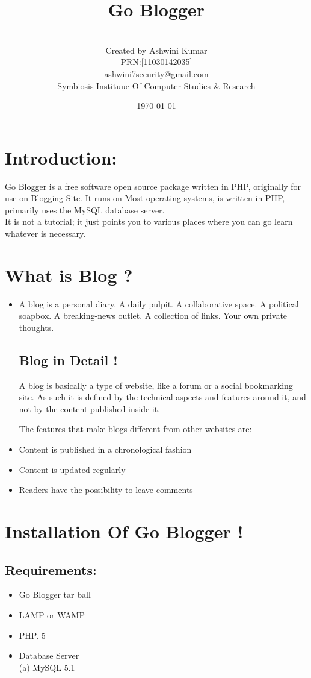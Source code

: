 \documentclass{article}
\title{Go Blogger}
\author{ {\sc }\\Created by Ashwini Kumar\\PRN:[11030142035]\\ashwini7security@gmail.com
\\Symbiosis Instituue Of Computer Studies \& Research\\}
\date{\today}
\begin{document}
\maketitle
\tableofcontents
\section{\bf Introduction:}
Go Blogger is a free software open source  package written in PHP, originally for use on Blogging Site.  It runs on Most operating systems, is written in PHP, primarily uses the MySQL database server.\\

 It is not a tutorial; it just points you to various places where you can go learn whatever is necessary. \\


\section{\bf What is Blog ?}
\begin{itemize}
 \item A blog is a personal diary. A daily pulpit. A collaborative space. A political soapbox. A breaking-news outlet. A collection of links. Your own private thoughts. 
\subsection{Blog in Detail !}
A blog is basically a type of website, like a forum or a social bookmarking site. As such it is defined by the technical aspects and features around it, and not by the content published inside it.

The features that make blogs different from other websites are:

\item Content is published in a chronological fashion
\item Content is updated regularly
\item Readers have the possibility to leave comments
\end{itemize}

\section{Installation Of Go Blogger !}

\subsection {\bf Requirements:} 
\begin{itemize}
\item Go Blogger tar ball \\
\item LAMP or WAMP\\
\item PHP. 5
\item Database Server \\
(a) MySQL 5.1 
\end{itemize}
\end{document}
